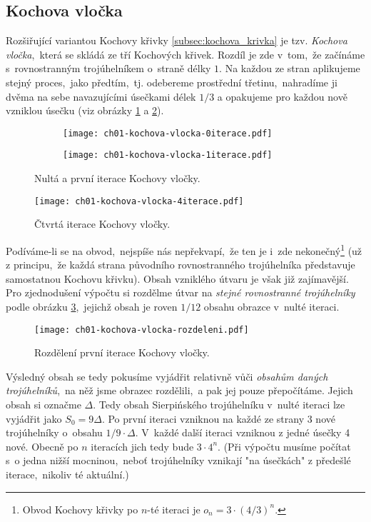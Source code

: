 \subsection{Kochova vločka}\label{subsec:kochova_vlocka}
Rozšiřující variantou Kochovy křivky \ref{subsec:kochova_krivka} je tzv. \emph{Kochova vločka},~která se skládá ze tří Kochových křivek. Rozdíl je zde v~tom,~že začínáme s~rovnostranným trojúhelníkem o~straně délky $1$. Na každou ze stran aplikujeme stejný proces,~jako předtím,~tj. odebereme prostřední třetinu,~nahradíme ji dvěma na sebe navazujícími úsečkami délek $1/3$ a opakujeme pro každou nově vzniklou úsečku (viz obrázky \ref{fig:kochova_vlocka_dve_iterace} a \ref{fig:kochova_krivka_5iterace}).
\begin{figure}[h]
    \centering
    \begin{subfigure}{\subfigwidth}
        \centering
        \texttt{[image: ch01-kochova-vlocka-0iterace.pdf]}
    \end{subfigure}
    \qquad
    \begin{subfigure}{\subfigwidth}
        \centering
        \texttt{[image: ch01-kochova-vlocka-1iterace.pdf]}
    \end{subfigure}
    \caption{Nultá a první iterace Kochovy vločky.}
    \label{fig:kochova_vlocka_dve_iterace}
\end{figure}
\begin{figure}[h]
    \centering
    \texttt{[image: ch01-kochova-vlocka-4iterace.pdf]}
    \caption{Čtvrtá iterace Kochovy vločky.}
    \label{fig:kochova_krivka_5iterace}
\end{figure}
Podíváme-li se na obvod,~nejspíše nás nepřekvapí,~že ten je i~zde nekonečný\footnote{Obvod Kochovy křivky po $n$-té iteraci je $o_n=3\cdot(4/3)^{n}$.} (už z principu,~že každá strana původního rovnostranného trojúhelníka představuje samostatnou Kochovu křivku).
Obsah vzniklého útvaru je však již zajímavější. Pro zjednodušení výpočtu si rozdělme útvar na \emph{stejné rovnostranné trojúhelníky} podle obrázku \ref{fig:kochova_vlocka_rozdeleni},~jejichž obsah je roven $1/12$ obsahu obrazce v~nulté iteraci.
\begin{figure}[h]
    \centering
    \texttt{[image: ch01-kochova-vlocka-rozdeleni.pdf]}
    \caption{Rozdělení první iterace Kochovy vločky.}
    \label{fig:kochova_vlocka_rozdeleni}
\end{figure}
Výsledný obsah se tedy pokusíme vyjádřit relativně vůči \emph{obsahům daných trojúhelníků},~na něž jsme obrazec rozdělili,~a pak jej pouze přepočítáme. Jejich obsah si označme $\Delta$. Tedy obsah Sierpińského trojúhelníku v~nulté iteraci lze vyjádřit jako $S_0=9\Delta$. Po první iteraci vzniknou na každé ze strany 3 nové trojúhelníky o~obsahu $1/9\cdot\Delta$. V~každé další iteraci vzniknou z jedné úsečky 4 nové. Obecně po $n$ iteracích jich tedy bude $3\cdot 4^{n}$. (Při výpočtu musíme počítat s~o jedna nižší mocninou,~neboť trojúhelníky vznikají "na úsečkách" z předešlé iterace,~nikoliv té aktuální.)\par
